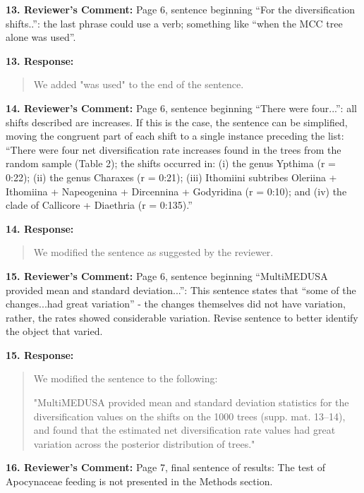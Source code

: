 \documentclass[]{article}
\begin{document}
\textbf{13. Reviewer's Comment:}
Page 6, sentence beginning “For the diversification shifts..”: the last phrase could use a verb; something like “when the MCC tree alone was used”.

\textbf{13. Response:}

\begin{quote}
\color{blue}
We added "was used" to the end of the sentence.
\end{quote}


\textbf{14. Reviewer's Comment:}
Page 6, sentence beginning “There were four...”: all shifts described are increases. If this is the case, the sentence can be simplified, moving the congruent part of each shift to a single instance preceding the list: “There were four net diversification rate increases found in the trees from the random sample (Table 2); the shifts occurred in: (i) the genus Ypthima (r = 0:22); (ii) the genus Charaxes (r = 0:21); (iii) Ithomiini subtribes Oleriina + Ithomiina + Napeogenina + Dircennina + Godyridina (r = 0:10); and (iv) the clade of Callicore + Diaethria (r = 0:135).”

\textbf{14. Response:}

\begin{quote}
\color{blue}
We modified the sentence as suggested by the reviewer.
\end{quote}



\textbf{15. Reviewer's Comment:}
Page 6, sentence beginning “MultiMEDUSA provided mean and standard deviation...”: This sentence states that “some of the changes...had great variation” - the changes themselves did not have variation, rather, the rates showed considerable variation. Revise sentence to better identify the object that varied.

\textbf{15. Response:}

\begin{quote}
\color{blue}
We modified the sentence to the following:

"MultiMEDUSA provided mean and standard deviation statistics for the
diversification values on the shifts on the 1000 trees (supp. mat.
13--14), and found that the estimated net diversification rate
values had great variation across the posterior distribution of trees."
\end{quote}


\textbf{16. Reviewer's Comment:}
Page 7, final sentence of results: The test of Apocynaceae feeding is not presented in the Methods section.
\end{document}
